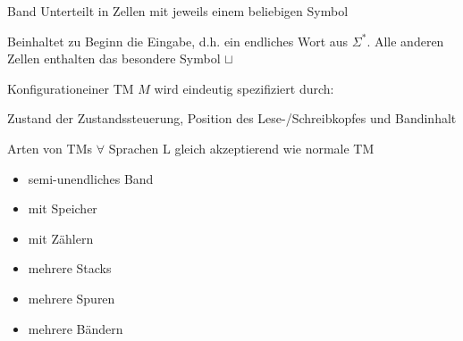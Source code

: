 \begin{definition}{Band} Unterteilt in Zellen mit jeweils einem beliebigen Symbol
    
    Beinhaltet zu Beginn die Eingabe, d.h. ein endliches Wort aus $\Sigma^{*}$. Alle anderen Zellen enthalten das besondere Symbol $\sqcup$
\end{definition}

\begin{definition}{Konfiguration}einer TM $M$ wird eindeutig spezifiziert durch:

    Zustand der Zustandssteuerung, Position des Lese-/Schreibkopfes und Bandinhalt
\end{definition}

\begin{concept}{Arten von TMs} $\forall$ Sprachen L gleich akzeptierend wie normale TM

    \vspace{1mm}

    \begin{minipage}{0.45\linewidth}
        \begin{itemize}
            \item semi-unendliches Band
            \item mit Speicher
            \item mit Zählern
        \end{itemize}
    \end{minipage}
    \begin{minipage}{0.45\linewidth}
        \begin{itemize}
            \item mehrere Stacks
            \item mehrere Spuren
            \item mehrere Bändern
        \end{itemize}
    \end{minipage}
\end{concept}

